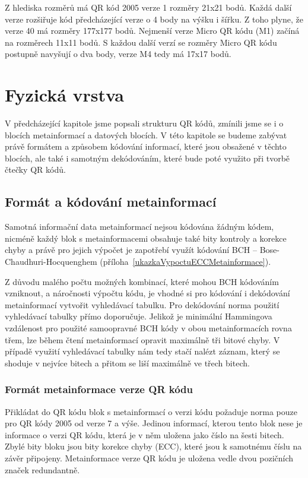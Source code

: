 Z hlediska rozměrů má QR kód 2005 verze 1 rozměry 21x21 bodů. Každá další
verze rozšiřuje kód předcházející verze o 4 body na výšku i šířku. Z toho plyne, že
verze 40 má rozměry 177x177 bodů. Nejmenší verze Micro QR kódu (M1) začíná na
rozměrech 11x11 bodů. S každou další verzí se rozměry Micro QR kódu postupně
navyšují o dva body, verze M4 tedy má 17x17 bodů.


\section{Fyzická vrstva}
\label{fyzickaVrstva}

V předcházející kapitole jsme popsali strukturu QR kódů, zmínili jsme se i o
blocích metainformací a datových blocích. V této kapitole se budeme zabývat 
právě formátem a způsobem kódování informací, které jsou obsažené v těchto 
blocích, ale také i samotným dekódováním, které bude poté využito při tvorbě 
čtečky QR kódů.

\subsection{Formát a kódování metainformací}
\label{formatMetainformaci}

Samotná informační data metainformací nejsou kódována žádným kódem, nicméně 
každý blok s metainformacemi obsahuje také bity kontroly a korekce chyby a právě
pro jejich výpočet je zapotřebí využít kódování BCH --
Bose-Chaudhuri-Hocquenghem (příloha~\ref{ukazkaVypoctuECCMetainformace}).

Z důvodu malého počtu možných kombinací, které mohou BCH kódováním vzniknout, a 
náročnosti výpočtu kódu, je vhodné si pro kódování i dekódování metainformací 
vytvořit vyhledávací tabulku. Pro dekódování norma použití vyhledávací tabulky 
přímo doporučuje. Jelikož je minimální Hammingova vzdálenost pro použité 
samoopravné BCH kódy v obou metainformacích rovna třem, lze během čtení 
metainformací opravit maximálně tři bitové chyby. V případě využití vyhledávací 
tabulky nám tedy stačí nalézt záznam, který se shoduje v nejvíce bitech a přitom
se liší maximálně ve třech bitech.


\subsubsection{Formát metainformace verze QR kódu}
\label{metainfoVersionEncoding}

Přikládat do QR kódu blok s metainformací o verzi kódu požaduje norma pouze pro
QR kódy 2005 od verze 7 a výše. Jedinou informací, kterou tento blok nese je 
informace o verzi QR kódu, která je v něm uložena jako číslo na šesti bitech. 
Zbylé bity bloku jsou bity korekce chyby (ECC), které jsou k samotnému číslu 
na závěr připojeny. Metainformace verze QR kódu je uložena vedle dvou pozičních 
značek redundantně.

